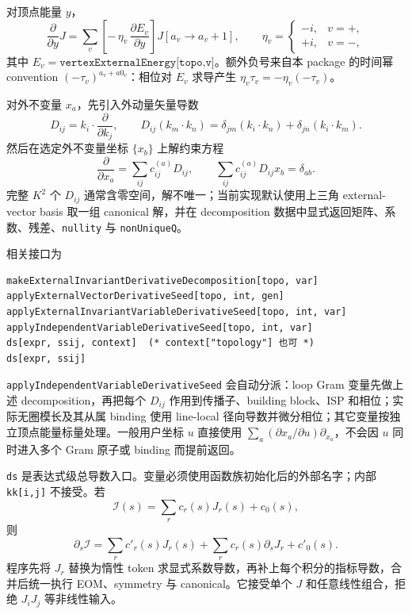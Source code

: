 ﻿\documentclass[a4paper,11pt]{article}
\begin{document}
对顶点能量 $y$，
\begin{equation}
 \frac{\partial}{\partial y}J
 =\sum_v
 \left[-\,\eta_v\,\frac{\partial E_v}{\partial y}\right]
 J[a_v\to a_v+1],
 \qquad
 \eta_v=
 \begin{cases}
 -i,&v=+,\\
 +i,&v=-,
 \end{cases}
\end{equation}
其中 $E_v=\texttt{vertexExternalEnergy[topo,v]}$。额外负号来自本 package 的时间幂 convention
$(-\tau_v)^{a_v+a0_v}$：相位对 $E_v$ 求导产生 $\eta_v\tau_v=-\eta_v(-\tau_v)$。

对外不变量 $x_a$，先引入外动量矢量导数
\begin{equation}
 D_{ij}=k_i\cdot\frac{\partial}{\partial k_j},
 \qquad
 D_{ij}(k_m\cdot k_n)
 =\delta_{jm}(k_i\cdot k_n)+\delta_{jn}(k_i\cdot k_m).
\end{equation}
然后在选定外不变量坐标 $\{x_b\}$ 上解约束方程
\begin{equation}
 \frac{\partial}{\partial x_a}
 =\sum_{ij}c^{(a)}_{ij}D_{ij},
 \qquad
 \sum_{ij}c^{(a)}_{ij}D_{ij}x_b=\delta_{ab}.
\end{equation}
完整 $K^2$ 个 $D_{ij}$ 通常含零空间，解不唯一；当前实现默认使用上三角 external-vector basis 取一组 canonical 解，并在 decomposition 数据中显式返回矩阵、系数、残差、\texttt{nullity} 与 \texttt{nonUniqueQ}。

相关接口为
\begin{verbatim}
makeExternalInvariantDerivativeDecomposition[topo, var]
applyExternalVectorDerivativeSeed[topo, int, gen]
applyExternalInvariantVariableDerivativeSeed[topo, int, var]
applyIndependentVariableDerivativeSeed[topo, int, var]
ds[expr, ssij, context]  (* context["topology"] 也可 *)
ds[expr, ssij]
\end{verbatim}
\texttt{applyIndependentVariableDerivativeSeed} 会自动分派：loop Gram 变量先做上述 decomposition，再把每个 $D_{ij}$ 作用到传播子、building block、ISP 和相位；实际无圈模长及其从属 binding 使用 line-local 径向导数并微分相位；其它变量按独立顶点能量标量处理。一般用户坐标 $u$ 直接使用 $\sum_a(\partial x_a/\partial u)\partial_{x_a}$，不会因 $u$ 同时进入多个 Gram 原子或 binding 而提前返回。

\texttt{ds} 是表达式级总导数入口。变量必须使用函数族初始化后的外部名字；内部 \texttt{kk[i,j]} 不接受。若
\begin{equation}
 \mathcal I(s)=\sum_r c_r(s)J_r(s)+c_0(s),
\end{equation}
则
\begin{equation}
 \partial_s\mathcal I
 =\sum_r c'_r(s)J_r(s)+\sum_r c_r(s)\partial_sJ_r+c'_0(s).
\end{equation}
程序先将 $J_r$ 替换为惰性 token 求显式系数导数，再补上每个积分的指标导数，合并后统一执行 EOM、symmetry 与 canonical。它接受单个 $J$ 和任意线性组合，拒绝 $J_iJ_j$ 等非线性输入。
\end{document}
